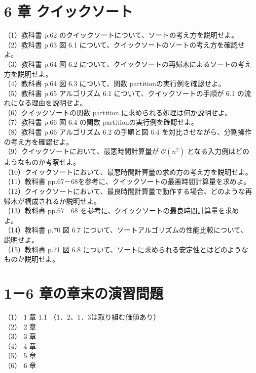 \documentclass[dvipdfmx]{jreport}
\begin{document}
\section*{6 章 クイックソート}
（1）教科書 p.62 のクイックソートについて、ソートの考え方を説明せよ。\\
（2）教科書 p.63 図 6.1 について、クイックソートのソートの考え方を確認せよ。\\
（3）教科書 p.64 図 6.2 について、クイックソートの再帰木によるソートの考え方を説明せよ。\\
（4）教科書 p.64 図 6.3 について、関数 partitionの実行例を確認せよ。\\
（5）教科書 p.65 アルゴリズム 6.1 について、クイックソートの手順が 6.1 の流れになる理由を説明せよ。\\
（6）クイックソートの関数 partition に求められる処理は何か説明せよ。\\
（7）教科書 p.66 図 6.4 の関数 partitionの実行例を確認せよ。\\
（8）教科書 p.66 アルゴリズム 6.2 の手順と図 6.4 を対比させながら、分割操作の考え方を確認せよ。\\
（9）クイックソートにおいて、最悪時間計算量が $\mathcal{O}\left(n^{2}\right)$ となる入力例はどのようなものか考察せよ。\\
（10）クイックソートにおいて、最悪時間計算量の求め方の考え方を説明せよ。\\
（11）教科書 pp.67－68を参考に、クイックソートの最悪時間計算量を求めよ。\\
（12）クイックソートにおいて、最良時間計算量で動作する場合、どのような再帰木が構成されるか説明せよ。\\
（13）教科書 pp.67－68 を参考に、クイックソートの最良時間計算量を求めよ。\\
（14）教科書 p.70 図 6.7 について、ソートアルゴリズムの性能比較について、説明せよ。\\
（15）教科書 p.71 図 6.8 について、ソートに求められる安定性とはどのようなものか説明せよ。

\section*{1－6 章の章末の演習問題}
（1） 1 章 1.1 （1．2、1．3は取り組む価値あり）\\
（2） 2 章\\
（3） 3 章\\
（4） 4 章\\
（5） 5 章\\
（6） 6 章
\end{document}
